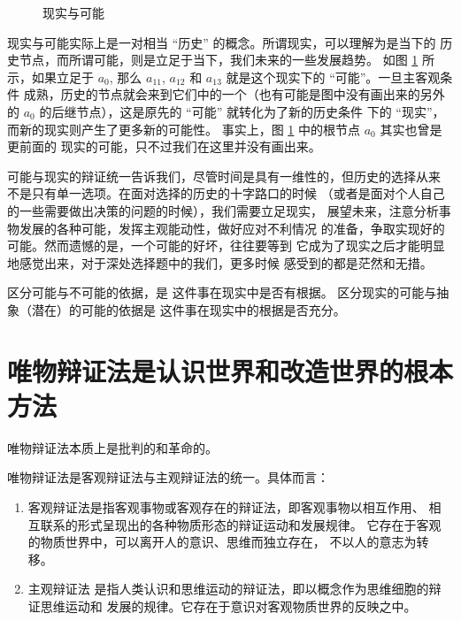 \documentclass[utf-8, 10pt]{article}
\begin{document}
\begin{figure}[H]
\begin{tikzpicture}[x=0.75pt,y=0.75pt,yscale=-1,xscale=1]
\end{tikzpicture}


    \caption{现实与可能}
    \label{现实与可能}
\end{figure}

现实与可能实际上是一对相当 “历史” 的概念。所谓现实，可以理解为是当下的
历史节点，而所谓可能，则是立足于当下，我们未来的一些发展趋势。
如图 \ref{现实与可能} 所示，如果立足于 $a_0$, 那么 $a_{11}$,
$a_{12}$ 和 $a_{13}$ 就是这个现实下的 “可能”。一旦主客观条件
成熟，历史的节点就会来到它们中的一个（也有可能是图中没有画出来的另外
的 $a_0$ 的后继节点），这是原先的 “可能” 就转化为了新的历史条件
下的 “现实”，而新的现实则产生了更多新的可能性。
事实上，图 \ref{现实与可能} 中的根节点 $a_0$ 其实也曾是更前面的
现实的可能，只不过我们在这里并没有画出来。

可能与现实的辩证统一告诉我们，尽管时间是具有一维性的，但历史的选择从来
不是只有单一选项。在面对选择的历史的十字路口的时候
（或者是面对个人自己的一些需要做出决策的问题的时候），我们需要立足现实，
展望未来，注意分析事物发展的各种可能，发挥主观能动性，做好应对不利情况
的准备，争取实现好的可能。然而遗憾的是，一个可能的好坏，往往要等到
它成为了现实之后才能明显地感觉出来，对于深处选择题中的我们，更多时候
感受到的都是茫然和无措。

区分可能与不可能的依据，是 {\kaishu 这件事在现实中是否有根据}。
区分现实的可能与抽象（潜在）的可能的依据是 {\kaishu 这件事在现实中的根据是否充分}。

\section{唯物辩证法是认识世界和改造世界的根本方法}

唯物辩证法本质上是批判的和革命的。

唯物辩证法是客观辩证法与主观辩证法的统一。具体而言：

\begin{enumerate}[label={$\left.\arabic*\right)$}, itemsep=0pt]
    \item 客观辩证法是指客观事物或客观存在的辩证法，即客观事物以相互作用、
    相互联系的形式呈现出的各种物质形态的辩证运动和发展规律。
    它存在于客观的物质世界中，可以离开人的意识、思维而独立存在，
    不以人的意志为转移。
    \item 主观辩证法
    是指人类认识和思维运动的辩证法，即以概念作为思维细胞的辩证思维运动和
    发展的规律。它存在于意识对客观物质世界的反映之中。
\end{enumerate}
\end{document}

